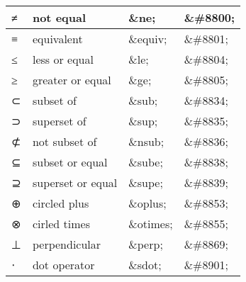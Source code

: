 \begin{longtable}{|l|l|l|l|}
\hline
≠	&not equal			&\&ne;		&\&\#8800;\\
\hline
≡	&equivalent			&\&equiv;		&\&\#8801;\\
\hline
≤	&less or equal		&\&le;		&\&\#8804;\\
\hline
≥	&greater or equal		&\&ge;		&\&\#8805;\\
\hline
⊂	&subset of			&\&sub;		&\&\#8834;\\
\hline
⊃	&superset of			&\&sup;		&\&\#8835;\\
\hline
⊄	&not subset of		&\&nsub;		&\&\#8836;\\
\hline
⊆	&subset or equal		&\&sube;		&\&\#8838;\\
\hline
⊇	&superset or equal		&\&supe;		&\&\#8839;\\
\hline
⊕	&circled plus			&\&oplus;		&\&\#8853;\\
\hline
⊗	&cirled times			&\&otimes;	&\&\#8855;\\
\hline
⊥	&perpendicular		&\&perp;		&\&\#8869;\\
\hline
⋅	&dot operator			&\&sdot;		&\&\#8901;\\
\hline
\end{longtable}



